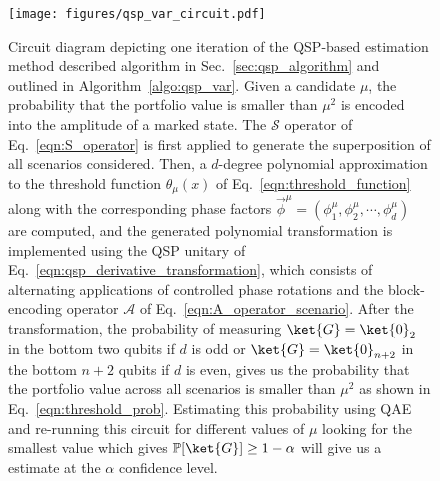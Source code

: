 \begin{enumerate}
\begin{figure}[t]
  \centering
  \texttt{[image: figures/qsp\_var\_circuit.pdf]}
  \caption{Circuit diagram depicting one iteration of the QSP-based \var{} estimation method described algorithm in Sec.~\ref{sec:qsp_algorithm} and outlined in Algorithm~\ref{algo:qsp_var}. Given a \var{} candidate $\mu$, the probability that the portfolio value is smaller than $\mu^2$ is encoded into the amplitude of a marked state. The $\mathcal{S}$ operator of Eq.~\eqref{eqn:S_operator} is first applied to generate the superposition of all scenarios considered.
  Then, a $d$-degree polynomial approximation to the threshold function $\theta_{\mu}(x)$ of Eq.~\eqref{eqn:threshold_function} along with the corresponding phase factors $\vec{\phi}^{\mu} = (\phi_1^{\mu}, \phi_2^{\mu}, \cdots, \phi_d^{\mu})$ are computed, and the generated polynomial transformation is implemented using the QSP unitary of Eq.~\eqref{eqn:qsp_derivative_transformation}, which consists of alternating applications of controlled phase rotations and the block-encoding operator $\mathcal{A}$ of Eq.~\eqref{eqn:A_operator_scenario}.
  After the transformation, the probability of measuring $\ket{G}=\ket{0}_2$ in the bottom two qubits if $d$ is odd or $\ket{G}=\ket{0}_{n+2}$ in the bottom $n+2$ qubits if $d$ is even, gives us the probability that the portfolio value across all scenarios is smaller than $\mu^2$ as shown in Eq.~\eqref{eqn:threshold_prob}.
  Estimating this probability using QAE and re-running this circuit for different values of $\mu$ looking for the smallest value which gives $\mathbb{P}[\ket{G}]\ge 1-\alpha$ will give us a \var{} estimate at the $\alpha$ confidence level.}
  \label{fig:qsp_var_circuit}
\end{figure}


\end{enumerate}
